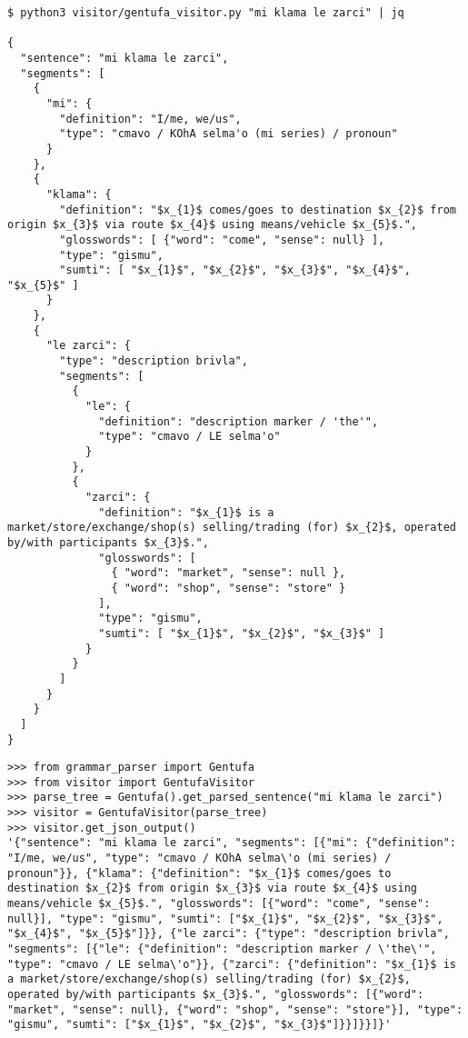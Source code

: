\begin{lstlisting}[caption=GentufaVisitor module being used as a command-line interface tool]
$ python3 visitor/gentufa_visitor.py "mi klama le zarci" | jq

{
  "sentence": "mi klama le zarci",
  "segments": [
    {
      "mi": {
        "definition": "I/me, we/us",
        "type": "cmavo / KOhA selma'o (mi series) / pronoun"
      }
    },
    {
      "klama": {
        "definition": "$x_{1}$ comes/goes to destination $x_{2}$ from origin $x_{3}$ via route $x_{4}$ using means/vehicle $x_{5}$.",
        "glosswords": [ {"word": "come", "sense": null} ],
        "type": "gismu",
        "sumti": [ "$x_{1}$", "$x_{2}$", "$x_{3}$", "$x_{4}$", "$x_{5}$" ]
      }
    },
    {
      "le zarci": {
        "type": "description brivla",
        "segments": [
          {
            "le": {
              "definition": "description marker / 'the'",
              "type": "cmavo / LE selma'o"
            }
          },
          {
            "zarci": {
              "definition": "$x_{1}$ is a market/store/exchange/shop(s) selling/trading (for) $x_{2}$, operated by/with participants $x_{3}$.",
              "glosswords": [
                { "word": "market", "sense": null },
                { "word": "shop", "sense": "store" }
              ],
              "type": "gismu",
              "sumti": [ "$x_{1}$", "$x_{2}$", "$x_{3}$" ]
            }
          }
        ]
      }
    }
  ]
}
\end{lstlisting}

\newpage

\begin{lstlisting}[caption=GentufaVisitor class being used by a Python script]
>>> from grammar_parser import Gentufa
>>> from visitor import GentufaVisitor
>>> parse_tree = Gentufa().get_parsed_sentence("mi klama le zarci")
>>> visitor = GentufaVisitor(parse_tree)
>>> visitor.get_json_output()
'{"sentence": "mi klama le zarci", "segments": [{"mi": {"definition": "I/me, we/us", "type": "cmavo / KOhA selma\'o (mi series) / pronoun"}}, {"klama": {"definition": "$x_{1}$ comes/goes to destination $x_{2}$ from origin $x_{3}$ via route $x_{4}$ using means/vehicle $x_{5}$.", "glosswords": [{"word": "come", "sense": null}], "type": "gismu", "sumti": ["$x_{1}$", "$x_{2}$", "$x_{3}$", "$x_{4}$", "$x_{5}$"]}}, {"le zarci": {"type": "description brivla", "segments": [{"le": {"definition": "description marker / \'the\'", "type": "cmavo / LE selma\'o"}}, {"zarci": {"definition": "$x_{1}$ is a market/store/exchange/shop(s) selling/trading (for) $x_{2}$, operated by/with participants $x_{3}$.", "glosswords": [{"word": "market", "sense": null}, {"word": "shop", "sense": "store"}], "type": "gismu", "sumti": ["$x_{1}$", "$x_{2}$", "$x_{3}$"]}}]}}]}'
\end{lstlisting}